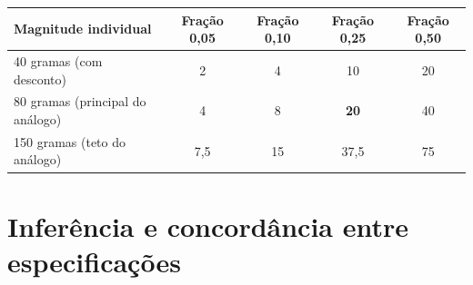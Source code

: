 \begin{apendicesenv}
\begin{quadro}[htb]
\caption{\label{qua:grade}Efeito plausível sobre a média municipal, em gramas}
\centering
\footnotesize
\begin{tabular}{@{}lcccc@{}}
\toprule
Magnitude individual & Fração 0,05 & Fração 0,10 & Fração 0,25 & Fração 0,50 \\
\midrule
40 gramas (com desconto) & 2 & 4 & 10 & 20 \\
80 gramas (principal do análogo) & 4 & 8 & \textbf{20} & 40 \\
150 gramas (teto do análogo) & 7,5 & 15 & 37,5 & 75 \\
\bottomrule
\end{tabular}
\end{quadro}

\section{Inferência e concordância entre especificações}


\end{apendicesenv}
